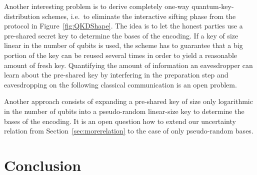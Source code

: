 Another interesting problem 
is to derive completely one-way
quantum-key-distribution schemes, i.e.~to eliminate the interactive
sifting phase from the protocol in Figure~\ref{fig:QKDShape}. The idea
is to let the honest parties use a pre-shared secret key to determine
the bases of the encoding. If a key of size linear in the number of
qubits is used, the scheme has to guarantee that a big portion of the
key can be reused several times in order to yield a reasonable amount
of fresh key. Quantifying the amount of information an eavesdropper can
learn about the pre-shared key by interfering in the preparation step
and eavesdropping on the following classical communication is an open
problem. 

Another approach consists of expanding a pre-shared key of
size only logarithmic in the number of qubits into a pseudo-random linear-size key
to determine the bases of the encoding. It is an open question how to
extend our uncertainty relation from Section~\ref{sec:morerelation}
to the case of only pseudo-random bases.






\chapter{Conclusion} \label{chap:conclusions}

